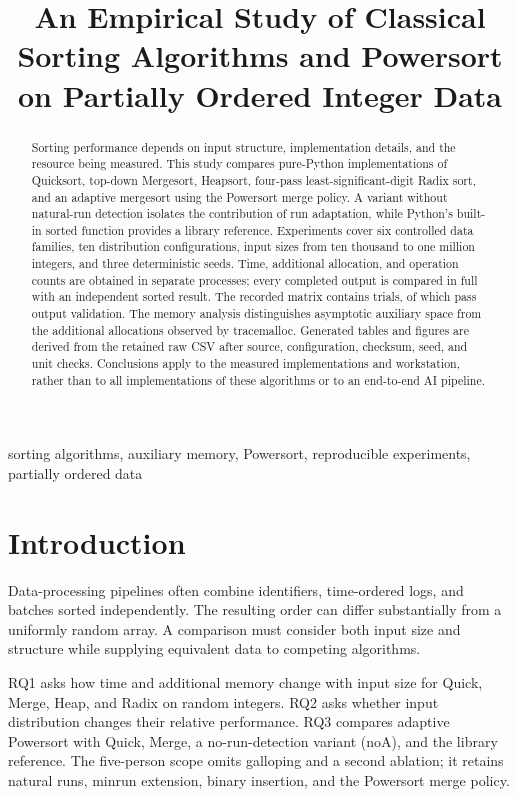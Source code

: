 \documentclass[conference]{IEEEtran}
\title{An Empirical Study of Classical Sorting Algorithms and Powersort on Partially Ordered Integer Data}
\author{\IEEEauthorblockN{My, Ngan, Hai, Thien, and Dan}
\IEEEauthorblockA{Group 1 --- CSD203 FA26}}
\begin{document}
\maketitle
\begin{abstract}
Sorting performance depends on input structure, implementation details, and the resource being measured. This study compares pure-Python implementations of Quicksort, top-down Mergesort, Heapsort, four-pass least-significant-digit Radix sort, and an adaptive mergesort using the Powersort merge policy. A variant without natural-run detection isolates the contribution of run adaptation, while Python's built-in sorted function provides a library reference. Experiments cover six controlled data families, ten distribution configurations, input sizes from ten thousand to one million integers, and three deterministic seeds. Time, additional allocation, and operation counts are obtained in separate processes; every completed output is compared in full with an independent sorted result. The recorded matrix contains \TrialCount{} trials, of which \OkCount{} pass output validation. The memory analysis distinguishes asymptotic auxiliary space from the additional allocations observed by tracemalloc. Generated tables and figures are derived from the retained raw CSV after source, configuration, checksum, seed, and unit checks. Conclusions apply to the measured implementations and workstation, rather than to all implementations of these algorithms or to an end-to-end AI pipeline.
\end{abstract}
\begin{IEEEkeywords}
sorting algorithms, auxiliary memory, Powersort, reproducible experiments, partially ordered data
\end{IEEEkeywords}

\section{Introduction}
Data-processing pipelines often combine identifiers, time-ordered logs, and batches sorted independently. The resulting order can differ substantially from a uniformly random array. A comparison must consider both input size and structure while supplying equivalent data to competing algorithms.

RQ1 asks how time and additional memory change with input size for Quick, Merge, Heap, and Radix on random integers. RQ2 asks whether input distribution changes their relative performance. RQ3 compares adaptive Powersort with Quick, Merge, a no-run-detection variant (noA), and the library reference. The five-person scope omits galloping and a second ablation; it retains natural runs, minrun extension, binary insertion, and the Powersort merge policy.
\end{document}
